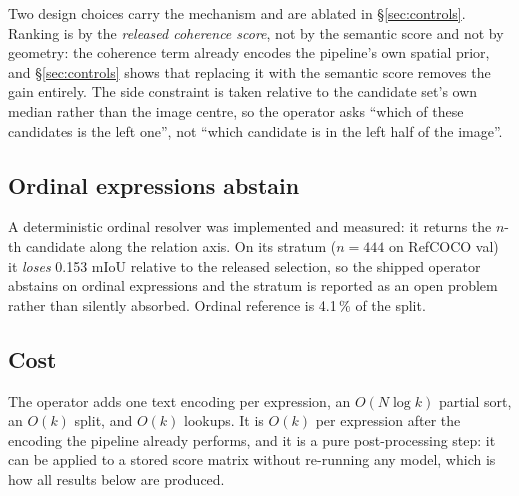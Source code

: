 Two design choices carry the mechanism and are ablated in
§\ref{sec:controls}. Ranking is by the \emph{released coherence score}, not by
the semantic score and not by geometry: the coherence term already encodes the
pipeline's own spatial prior, and §\ref{sec:controls} shows that replacing it
with the semantic score removes the gain entirely. The side constraint is
taken relative to the candidate set's own median rather than the image centre,
so the operator asks ``which of these candidates is the left one'', not ``which
candidate is in the left half of the image''.

\subsection{Ordinal expressions abstain}

A deterministic ordinal resolver was implemented and measured: it returns the
$n$-th candidate along the relation axis. On its stratum ($n=444$ on RefCOCO
val) it \emph{loses} 0.153 mIoU relative to the released selection, so the
shipped operator abstains on ordinal expressions and the stratum is reported as
an open problem rather than silently absorbed. Ordinal reference is 4.1\,\% of
the split.

\subsection{Cost}

The operator adds one text encoding per expression, an $O(N\log k)$ partial
sort, an $O(k)$ split, and $O(k)$ lookups. It is $O(k)$ per expression after
the encoding the pipeline already performs, and it is a pure post-processing
step: it can be applied to a stored score matrix without re-running any model,
which is how all results below are produced.
